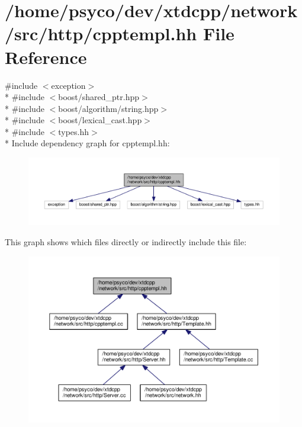 \hypertarget{cpptempl_8hh}{}\section{/home/psyco/dev/xtdcpp/network/src/http/cpptempl.hh File Reference}
\label{cpptempl_8hh}
{\ttfamily \#include $<$exception$>$}\\*
{\ttfamily \#include $<$boost/shared\+\_\+ptr.\+hpp$>$}\\*
{\ttfamily \#include $<$boost/algorithm/string.\+hpp$>$}\\*
{\ttfamily \#include $<$boost/lexical\+\_\+cast.\+hpp$>$}\\*
{\ttfamily \#include $<$types.\+hh$>$}\\*
Include dependency graph for cpptempl.\+hh\+:
\nopagebreak
\begin{figure}[H]
\begin{center}
\leavevmode
\includegraphics[width=350pt]{cpptempl_8hh__incl}
\end{center}
\end{figure}
This graph shows which files directly or indirectly include this file\+:
\nopagebreak
\begin{figure}[H]
\begin{center}
\leavevmode
\includegraphics[width=350pt]{cpptempl_8hh__dep__incl}
\end{center}
\end{figure}
